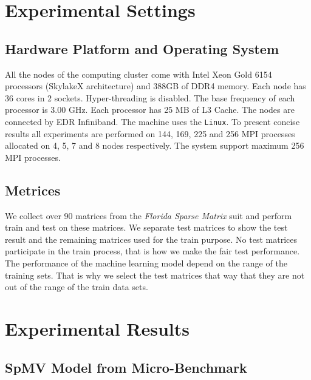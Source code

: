 \documentclass[conference, 10ppt]{IEEEtran}
\begin{document}
\section{Experimental Settings}
\subsection{Hardware Platform and Operating System}
All the nodes of the computing cluster come with Intel Xeon Gold
6154 processors (SkylakeX architecture) and 388GB of DDR4
memory. Each node has 36 cores in 2 sockets. Hyper-threading is
disabled. The base frequency of each processor is 3.00 GHz.  Each
processor has 25 MB of L3 Cache. The nodes are connected by EDR
Infiniband. The machine uses the \texttt{Linux}. To present
concise results all experiments are performed on 144, 169, 225 and 256 MPI processes
allocated on 4, 5, 7 and 8 nodes respectively. The system support maximum 256 MPI processes.

\subsection{Metrices}
We collect over 90 matrices from the \textit{Florida Sparse Matrix} suit 
and perform train and test on these matrices. We separate test matrices 
to show the test result and the remaining matrices used for the train purpose. 
No test matrices participate in the train process, that is how we make the 
fair test performance. The performance of the machine learning model depend 
on the range of the training sets. That is why we select the test matrices 
that way that they are not out of the range of the train data sets. 

\section{Experimental Results}
\subsection{SpMV Model from Micro-Benchmark}
\end{document}
